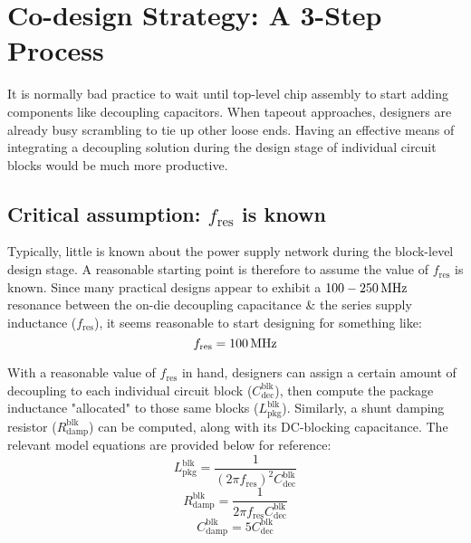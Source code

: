 \section{Co-design Strategy: A 3-Step Process}
\par It is normally bad practice to wait until top-level chip assembly to
start adding components like decoupling capacitors. When tapeout approaches,
designers are already busy scrambling to tie up other loose ends.
Having an effective means of integrating a decoupling solution during
the design stage of individual circuit blocks would be much more
productive.
%
\subsection{Critical assumption: $f_\mathrm{res}$ is known}
\par Typically, little is known about the power supply network during the
block-level design stage.  A reasonable starting point is therefore to assume the
value of $f_\mathrm{res}$ is known. Since many practical designs appear to
exhibit a $100-250\mathrm{\,MHz}$ resonance between the on-die decoupling capacitance
\& the series supply inductance ($f_\mathrm{res}$), it seems reasonable
to start designing for something like:
\begin{equation}
	f_\mathrm{res}=100\mathrm{\,MHz}
\end{equation}
%
\par With a reasonable value of $f_\mathrm{res}$ in hand, designers can
assign a certain amount of decoupling to each individual circuit block
($C_\mathrm{dec}^\mathrm{blk}$), then compute the package inductance
"allocated" to those same blocks ($L_\mathrm{pkg}^\mathrm{blk}$).
Similarly, a shunt damping resistor ($R_\mathrm{damp}^\mathrm{blk}$)
can be computed, along with its DC-blocking capacitance. The relevant
model equations are provided below for reference:
%
\begin{equation}
	L_\mathrm{pkg}^\mathrm{blk} = \frac{1}{(2\pi f_\mathrm{res})^2 C_\mathrm{dec}^\mathrm{blk}}
\end{equation}
\begin{equation}
	R_\mathrm{damp}^\mathrm{blk} = \frac{1}{2\pi f_\mathrm{res}C_\mathrm{dec}^\mathrm{blk}}
\end{equation}
\begin{equation}
	C_\mathrm{damp}^\mathrm{blk} = 5C_\mathrm{dec}^\mathrm{blk}
\end{equation}
%

